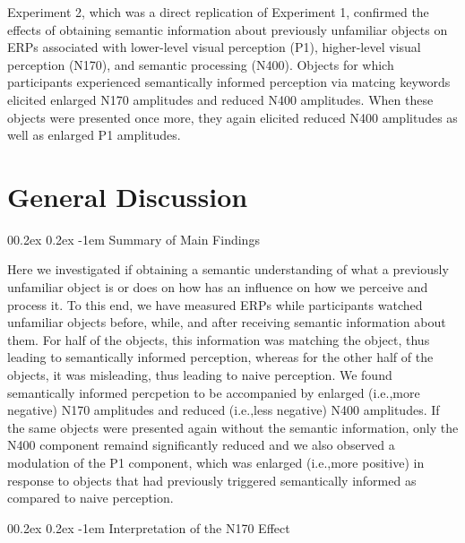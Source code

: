 \documentclass[
  english,
  man,12pt,twoside]{apa7}
\makeatletter
\let\oldparagraph\paragraph
\renewcommand{\paragraph}[1]{\oldparagraph{#1}\mbox{}}
\renewcommand{\paragraph}{\@startsection{paragraph}{4}{\parindent}%
  {0\baselineskip \@plus 0.2ex \@minus 0.2ex}%
  {-1em}%
  {\normalfont\normalsize\bfseries\itshape\typesectitle}}
\makeatother
\begin{document}
Experiment 2, which was a direct replication of Experiment 1, confirmed the effects of obtaining semantic information about previously unfamiliar objects on ERPs associated with lower-level visual perception (P1), higher-level visual perception (N170), and semantic processing (N400). Objects for which participants experienced semantically informed perception via matcing keywords elicited enlarged N170 amplitudes and reduced N400 amplitudes. When these objects were presented once more, they again elicited reduced N400 amplitudes as well as enlarged P1 amplitudes.

\hypertarget{general-discussion}{%
\section{General Discussion}\label{general-discussion}}

\hypertarget{summary-of-main-findings}{%
\paragraph{Summary of Main Findings}\label{summary-of-main-findings}}

Here we investigated if obtaining a semantic understanding of what a previously unfamiliar object is or does on how has an influence on how we perceive and process it. To this end, we have measured ERPs while participants watched unfamiliar objects before, while, and after receiving semantic information about them. For half of the objects, this information was matching the object, thus leading to semantically informed perception, whereas for the other half of the objects, it was misleading, thus leading to naive perception. We found semantically informed percpetion to be accompanied by enlarged (i.e.,more negative) N170 amplitudes and reduced (i.e.,less negative) N400 amplitudes. If the same objects were presented again without the semantic information, only the N400 component remaind significantly reduced and we also observed a modulation of the P1 component, which was enlarged (i.e.,more positive) in response to objects that had previously triggered semantically informed as compared to naive perception.

\hypertarget{interpretation-of-the-n170-effect}{%
\paragraph{Interpretation of the N170 Effect}\label{interpretation-of-the-n170-effect}}
\end{document}
